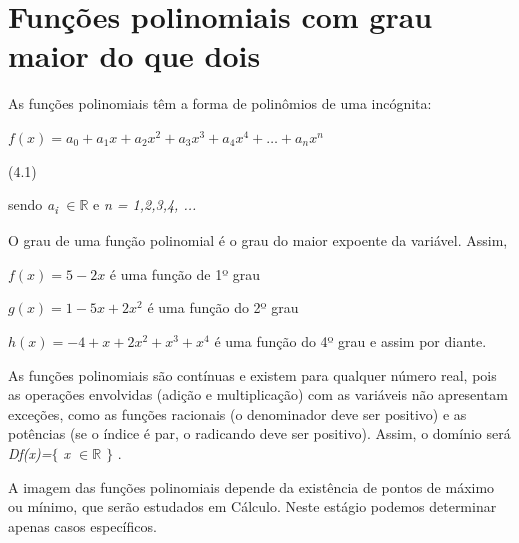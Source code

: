 \section{Funções polinomiais com grau maior do que dois}
\begin{caixa}
\begin{tdefinicao}

As funções polinomiais têm a forma de polinômios de uma incógnita:

 \( f \left( x \right) =a_{0}+a_{1}x+a_{2}x^{2}+a_{3}x^{3}+a_{4}x^{4}+ \ldots +a_{n}x^{n} \) \begin{flushright}(4.1)\end{flushright}

sendo \textit{a\textsubscript{i}} $ \in \mathbb{R} $ e \textit{n = 1,2,3,4, ...}
\end{tdefinicao}
\end{caixa}
O grau de uma função polinomial é o grau do maior expoente da variável. Assim,

 \( f \left( x \right) =5-2x \) é uma função de 1º grau

 \( g \left( x \right) = 1-5x+2x^{2} \) é uma função do 2º grau

 \( h \left( x \right) = -4+x+2x^{2}+x^{3}+x^{4} \) é uma função do 4º grau e assim por diante.

\begin{justify}
\quad As funções polinomiais são contínuas e existem para qualquer número real, pois as operações envolvidas (adição e multiplicação) com as variáveis não apresentam exceções, como as funções racionais (o denominador deve ser positivo) e as potências (se o índice é par, o radicando deve ser positivo). Assim, o domínio será \textit{Df(x)=$ \{ $ x $ \in \mathbb{R} $  \textbf{ }$ \} $ }. 
\end{justify}

\begin{justify}
\quad A imagem das funções polinomiais depende da existência de pontos de máximo ou mínimo, que serão estudados em Cálculo. Neste estágio podemos determinar apenas casos específicos.
\end{justify}


